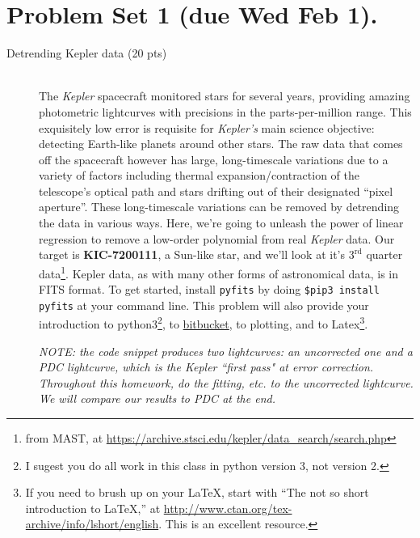 %
%
%





\section*{Problem Set 1 (due Wed Feb 1).}
\begin{description}
\item[Detrending Kepler data (20 pts)] ~\\
    The \emph{Kepler} spacecraft monitored stars for several years, 
    providing amazing photometric lightcurves with precisions in
    the parts-per-million range.  This exquisitely low error is
    requisite for \emph{Kepler's} main science objective: detecting
    Earth-like planets around other stars.  The raw data that comes
    off the spacecraft however has large, long-timescale variations
    due to a variety of factors including thermal
    expansion/contraction of the telescope's optical path and 
    stars drifting out of their designated ``pixel aperture''.  These
    long-timescale variations can be removed by detrending the data in
    various ways.  Here, we're going to unleash the power of linear
    regression to remove a low-order polynomial from real
    \emph{Kepler} data.  Our target is \textbf{KIC-7200111}, 
    a Sun-like star, and we'll look at it's $3^{\textrm{rd}}$ quarter
    data\footnote{from MAST, at 
      \url{https://archive.stsci.edu/kepler/data_search/search.php}}.
    Kepler data, as with many other forms of
    astronomical data, is in FITS format.  To get started, install 
    \verb+pyfits+ by doing \verb+$pip3 install pyfits+ at your command
    line.   This problem
    will also provide your introduction to python3\footnote{I sugest you do
      all work in this class in python version 3, not version 2.},
    to \href{https://bitbucket.org/}{bitbucket},
    to plotting, and to Latex\footnote{If you need to brush up
      on your LaTeX, start with ``The not so short introduction to
      LaTeX,'' at \href{http://www.ctan.org/tex-archive/info/lshort/english/}{http://www.ctan.org/tex-archive/info/lshort/english}.
      This is an excellent resource.}.

    \emph{NOTE: the code snippet
       produces two lightcurves: an uncorrected one and a PDC
       lightcurve, which is the Kepler ``first pass" at error
       correction.  Throughout this homework, do the fitting, etc. to
       the uncorrected lightcurve.  We will compare our results to PDC at the end.}


\end{description}
